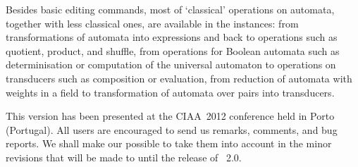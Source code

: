 Besides basic editing commands, most of `classical' operations on
automata, together with less classical ones, are available in the
\tafkit instances: from transformations of automata into expressions
and back to operations such as quotient, product, and shuffle, from
operations for Boolean automata such as determinisation or
computation of the universal automaton to operations on transducers
such as composition or evaluation, from reduction of automata with
weights in a field to transformation of automata over pairs into
transducers.




This version \tafkitv has been presented at the CIAA~2012 conference held in 
Porto (Portugal).
All users are encouraged to send us remarks, comments, and bug reports.
We shall make our possible to take them into account in the minor 
revisions that will be made to \vcsnv until the release of \vcsn~2.0.

\endinput 





















